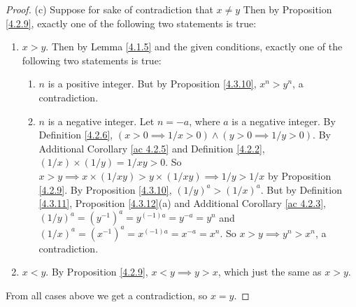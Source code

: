 \begin{proof}{(c)}
Suppose for sake of contradiction that \(x \neq y\)
Then by Proposition \ref{4.2.9}, exactly one of the following two statements is true:
\begin{enumerate}[label=(\Roman*)]
    \item \(x > y\).
    Then by Lemma \ref{4.1.5} and the given conditions, exactly one of the following two statements is true:
    \begin{enumerate}[label=(\roman*)]
        \item \(n\) is a positive integer.
        But by Proposition \ref{4.3.10}, \(x^n > y^n\), a contradiction.
        \item \(n\) is a negative integer.
        Let \(n = -a\), where \(a\) is a negative integer.
        By Definition \ref{4.2.6}, \((x > 0 \implies 1 / x > 0) \land (y > 0 \implies 1 / y > 0)\).
        By Additional Corollary \ref{ac 4.2.5} and Definition \ref{4.2.2}, \((1 / x) \times (1 / y) = 1 / xy > 0\).
        So \(x > y \implies x \times (1 / xy) > y \times (1 / xy) \implies 1 / y > 1 / x\) by Proposition \ref{4.2.9}.
        By Proposition \ref{4.3.10}, \((1 / y)^a > (1 / x)^a\).
        But by Definition \ref{4.3.11}, Proposition \ref{4.3.12}(a) and Additional Corollary \ref{ac 4.2.3}, \((1 / y)^a = (y^{-1})^a = y^{(-1)a} = y^{-a} = y^n\) and \((1 / x)^a = (x^{-1})^a = x^{(-1)a} = x^{-a} = x^n\).
        So \(x > y \implies y^n > x^n\), a contradiction.
    \end{enumerate}
    \item \(x < y\).
    By Proposition \ref{4.2.9}, \(x < y \implies y > x\), which just the same as \(x > y\).
\end{enumerate}
From all cases above we get a contradiction, so \(x = y\).
\end{proof}


